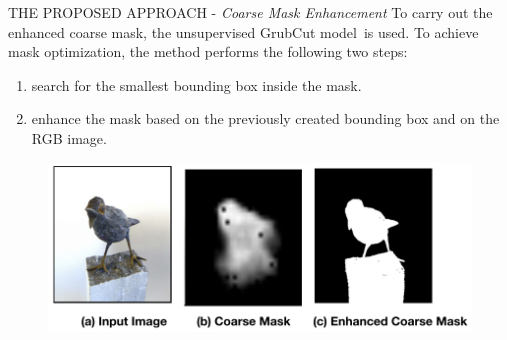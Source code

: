 \begin{frame}{THE PROPOSED APPROACH - \emph{Coarse Mask Enhancement}}
    To carry out the enhanced coarse mask, the unsupervised GrubCut 
    model\footnotemark ~is used. To achieve mask optimization, the 
    method performs the following two steps:
    \begin{minipage}{\linewidth}
        \centering
        \begin{minipage}{0.45\linewidth}
            \begin{enumerate}
                \item search for the smallest bounding box inside the mask.
                \item enhance the mask based on the previously created bounding box and on the RGB image.
            \end{enumerate}
        \end{minipage}
        \hspace{0.05\linewidth}
        \begin{minipage}{0.45\linewidth}
            \begin{figure}[h!]
                \centering
                \includegraphics[width = 1.2 \linewidth]{images/paper6/enhancement.png}
                \centering
            \end{figure}
        \end{minipage}
    \end{minipage}
\end{frame}


